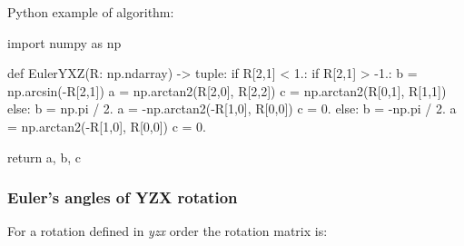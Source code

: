     Python example of algorithm:

\begin{python}

import numpy as np

def EulerYXZ(R: np.ndarray) -> tuple:
    if R[2,1] < 1.:
        if R[2,1] > -1.:
            b = np.arcsin(-R[2,1])
            a = np.arctan2(R[2,0], R[2,2])
            c = np.arctan2(R[0,1], R[1,1])
        else:
            b = np.pi / 2.
            a = -np.arctan2(-R[1,0], R[0,0])
            c = 0.
    else:
        b = -np.pi / 2.
        a = np.arctan2(-R[1,0], R[0,0])
        c = 0.

    return a, b, c
\end{python}

\subsubsection{Euler's angles of \textbf{YZX} rotation}

    For a rotation defined in \textit{yzx} order the rotation matrix is:

